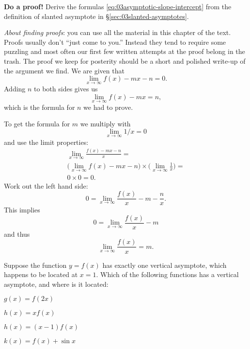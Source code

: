 \begin{multicols}{2}
\problem \textbf{Do a proof!}  Derive the formulas
\eqref{eq:03asymptotic-slope-intercept} 
\label{ex:prove-asymptotic-slope-intercept}
from the definition of slanted asymptote in
\S\ref{sec:03slanted-asymptotes}.

\textit{About finding proofs}:  you can use all the material in this chapter of
the text.  Proofs usually don't ``just come to you.'' Instead they tend to
require some puzzling and most often our first few written attempts at the proof
belong in the trash.  The proof we keep for posterity should be a short and
polished write-up of the argument we find.
\answer
We are given that
\[
\lim_{x\to\infty} f(x) - mx-n = 0.
\]
Adding $n$ to both sides gives us
\[
\lim_{x\to\infty} f(x) -mx = n,
\]
which is the formula for $n$ we had to prove.

To get the formula for $m$ we multiply with
\[
\lim_{x\to\infty} 1/x =
0
\]
and use the limit properties:
\begin{multline*}
  \lim_{x\to\infty} \frac{f(x)-mx-n}{x} = \\
  \bigl(\lim_{x\to\infty} f(x)-mx-n\bigr)\times
  \bigl(\lim_{x\to\infty}\frac{1}{x}\bigr)=\\
  0\times0 = 0.
\end{multline*}
Work out the left hand side:
\[
0 = \lim_{x\to\infty} \frac{f(x)}{x} - m - \frac{n}{x}.
\]
This implies 
\[
0 = \lim_{x\to\infty} \frac{f(x)}{x} - m
\]
and thus
\[
\lim_{x\to\infty} \frac{f(x)}{x} = m.
\]

\endanswer


\problem Suppose the function $y=f(x)$ has exactly one vertical
asymptote, which happens to be located at $x=1$.  
Which of the following functions has a vertical asymptote, and where
is it located:

\subprob  $g(x) = f(2x)$ 

\subprob  $h(x) = xf(x)$ 

\subprob  $h(x) = (x-1)f(x)$ 

\subprob  $k(x) = f(x)+\sin x$ 

\end{multicols}
\noproblemfont


